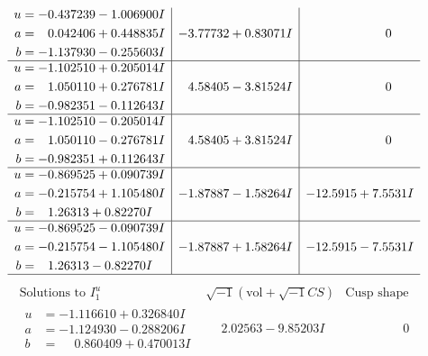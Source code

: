\documentclass[1p]{elsarticle_modified}
\theoremstyle{definition}
\newcommand{\I}{\sqrt{-1}}
\begin{document}
$$\begin{array}{c|c|c}
\begin{aligned}
u &= -0.437239 - 1.006900 I \\
a &= \phantom{-}0.042406 + 0.448835 I \\
b &= -1.137930 - 0.255603 I\end{aligned}
 & -3.77732 + 0.83071 I & \phantom{-0.000000 } 0 \\ \hline\begin{aligned}
u &= -1.102510 + 0.205014 I \\
a &= \phantom{-}1.050110 + 0.276781 I \\
b &= -0.982351 - 0.112643 I\end{aligned}
 & \phantom{-}4.58405 - 3.81524 I & \phantom{-0.000000 } 0 \\ \hline\begin{aligned}
u &= -1.102510 - 0.205014 I \\
a &= \phantom{-}1.050110 - 0.276781 I \\
b &= -0.982351 + 0.112643 I\end{aligned}
 & \phantom{-}4.58405 + 3.81524 I & \phantom{-0.000000 } 0 \\ \hline\begin{aligned}
u &= -0.869525 + 0.090739 I \\
a &= -0.215754 + 1.105480 I \\
b &= \phantom{-}1.26313 + 0.82270 I\end{aligned}
 & -1.87887 - 1.58264 I & -12.5915 + 7.5531 I \\ \hline\begin{aligned}
u &= -0.869525 - 0.090739 I \\
a &= -0.215754 - 1.105480 I \\
b &= \phantom{-}1.26313 - 0.82270 I\end{aligned}
 & -1.87887 + 1.58264 I & -12.5915 - 7.5531 I\\
 \hline 
 \end{array}$$\newpage$$\begin{array}{c|c|c}  
\text{Solutions to }I^u_{1}& \I (\text{vol} + \sqrt{-1}CS) & \text{Cusp shape}\\
 \hline 
\begin{aligned}
u &= -1.116610 + 0.326840 I \\
a &= -1.124930 - 0.288206 I \\
b &= \phantom{-}0.860409 + 0.470013 I\end{aligned}
 & \phantom{-}2.02563 - 9.85203 I & \phantom{-0.000000 } 0 \\ \hline\begin{aligned}

\end{aligned}
\end{array}$$
\end{document}
